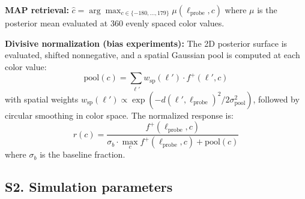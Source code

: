 \documentclass[11pt,letterpaper]{article}
\begin{document}
\textbf{MAP retrieval:} $\hat{c} = \arg\max_{c \in \{-180, \ldots, 179\}} \mu(\ell_{\mathrm{probe}}, c)$ where $\mu$ is the posterior mean evaluated at 360 evenly spaced color values.

\textbf{Divisive normalization (bias experiments):} The 2D posterior surface is evaluated, shifted nonnegative, and a spatial Gaussian pool is computed at each color value:
\[
\mathrm{pool}(c) = \sum_{\ell'} w_{\mathrm{sp}}(\ell') \cdot f^+(\ell', c)
\]
with spatial weights $w_{\mathrm{sp}}(\ell') \propto \exp(-d(\ell', \ell_{\mathrm{probe}})^2 / 2\sigma_{\mathrm{pool}}^2)$, followed by circular smoothing in color space. The normalized response is:
\[
r(c) = \frac{f^+(\ell_{\mathrm{probe}}, c)}{\sigma_b \cdot \max_c f^+(\ell_{\mathrm{probe}}, c) + \mathrm{pool}(c)}
\]
where $\sigma_b$ is the baseline fraction.


\subsection*{S2. Simulation parameters}
\end{document}
